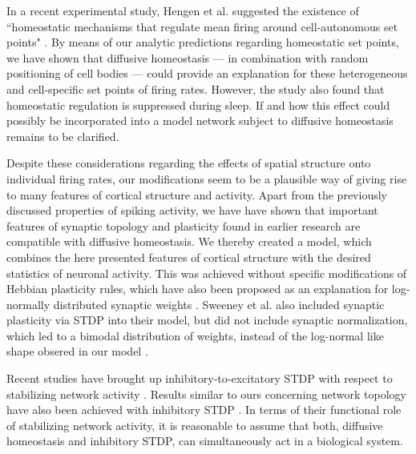 \documentclass[10pt,letterpaper]{article}
\begin{document}
In a recent experimental study, Hengen et al. suggested the existence of ``homeostatic mechanisms that regulate mean firing around cell-autonomous set points" \cite{Hengen_2016}. By means of our analytic predictions regarding homeostatic set points, we have shown that diffusive homeostasis --- in combination with random positioning of cell bodies --- could provide an explanation for these heterogeneous and cell-specific set points of firing rates. However, the study also found that homeostatic regulation is suppressed during sleep. If and how this effect could possibly be incorporated into a model network subject to diffusive homeostasis remains to be clarified.

Despite these considerations regarding the effects of spatial structure onto individual firing rates, our modifications seem to be a plausible way of giving rise to many features of cortical structure and activity. Apart from the previously discussed properties of spiking activity, we have have shown that important features of synaptic topology and plasticity found in earlier research are compatible with diffusive homeostasis. We thereby created a model, which combines the here presented features of cortical structure with the desired statistics of neuronal activity. This was achieved without specific modifications of Hebbian plasticity rules, which have also been proposed as an explanation for log-normally distributed synaptic weights \cite{Koulakov_2009,Gilson_2011,Effenberger_2015}. Sweeney et al. also included synaptic plasticity via STDP into their model, but did not include synaptic normalization, which led to a bimodal distribution of weights, instead of the log-normal like shape obsered in our model \cite{Sweeney_Paper}.

Recent studies have brought up inhibitory-to-excitatory STDP with respect to stabilizing network activity \cite{Vogels_2011,Luz_2012}. Results similar to ours concerning network topology have also been achieved with inhibitory STDP \cite{Effenberger_2015}. In terms of their functional role of stabilizing network activity, it is reasonable to assume that both, diffusive homeostasis and inhibitory STDP, can simultaneously act in a biological system.
\end{document}
